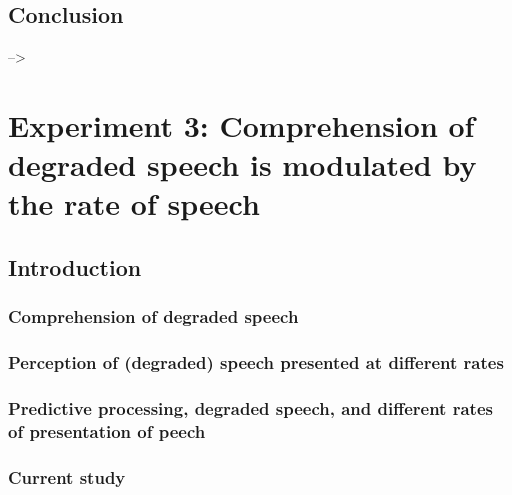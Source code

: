 \documentclass[a4paper, nobind]{templates/ociamthesis}
\begin{document}
\hypertarget{conclusion}{%
\section{Conclusion}\label{conclusion}}

--\textgreater{}

\hypertarget{experiment-3-comprehension-of-degraded-speech-is-modulated-by-the-rate-of-speech}{%
\chapter{Experiment 3: Comprehension of degraded speech is modulated by the rate of speech}\label{experiment-3-comprehension-of-degraded-speech-is-modulated-by-the-rate-of-speech}}

\minitoc

\hypertarget{introduction-2}{%
\section{Introduction}\label{introduction-2}}

\hypertarget{comprehension-of-degraded-speech-1}{%
\subsection{Comprehension of degraded speech}\label{comprehension-of-degraded-speech-1}}

\hypertarget{perception-of-degraded-speech-presented-at-different-rates}{%
\subsection{Perception of (degraded) speech presented at different rates}\label{perception-of-degraded-speech-presented-at-different-rates}}

\hypertarget{predictive-processing-degraded-speech-and-different-rates-of-presentation-of-peech}{%
\subsection{Predictive processing, degraded speech, and different rates of presentation of peech}\label{predictive-processing-degraded-speech-and-different-rates-of-presentation-of-peech}}

\hypertarget{current-study-1}{%
\subsection{Current study}\label{current-study-1}}
\end{document}
